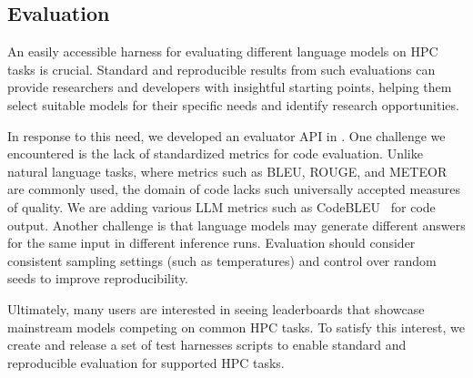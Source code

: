 \vspace{-10pt}
\subsection{Evaluation}
An easily accessible harness for evaluating different language models on HPC tasks is crucial. Standard and reproducible results from such evaluations can provide researchers and developers with insightful starting points, helping them select suitable models for their specific needs and identify research opportunities. 

In response to this need, we developed an evaluator API in \ourwork. One challenge we encountered is the lack of standardized metrics for code evaluation. Unlike natural language tasks, where metrics such as BLEU,
ROUGE,
and METEOR
are commonly used, the domain of code lacks such universally accepted measures of quality. We are adding various LLM metrics such as CodeBLEU~\cite{ren2020codebleu} for code output.
Another challenge is that language models may generate different answers for the same input in different inference runs. Evaluation should consider consistent sampling settings (such as temperatures) and control over random seeds to improve reproducibility.  




Ultimately, many users are interested in seeing leaderboards that showcase mainstream models competing on common HPC tasks. To satisfy this interest, we create and release a set of test harnesses scripts to enable standard and reproducible evaluation for supported HPC tasks.



\vspace{-10pt}